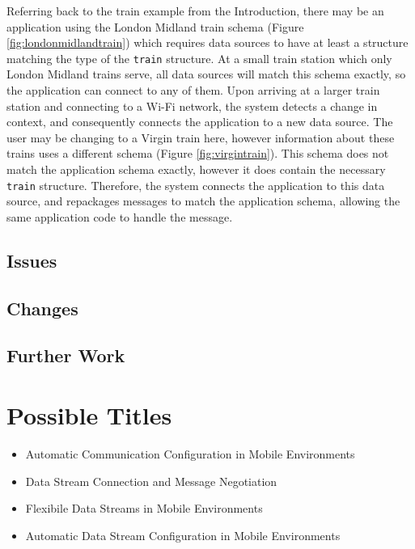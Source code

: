 \documentclass[12pt,twoside,notitlepage]{report}
\begin{document}
Referring back to the train example from the Introduction, there may be an application using the London Midland train schema (Figure \ref{fig:londonmidlandtrain}) which requires data sources to have at least a structure matching the type of the {\tt train} structure. 
At a small train station which only London Midland trains serve, all data sources will match this schema exactly, so the application can connect to any of them.
Upon arriving at a larger train station and connecting to a Wi-Fi network, the system detects a change in context, and consequently connects the application to a new data source. 
The user may be changing to a Virgin train here, however information about these trains uses a different schema (Figure \ref{fig:virgintrain}). 
This schema does not match the application schema exactly, however it does contain the necessary {\tt train} structure. 
Therefore, the system connects the application to this data source, and repackages messages to match the application schema, allowing the same application code to handle the message.

\section{Issues}

\section{Changes}

\section{Further Work}


\cleardoublepage


\nocite{*}

\cleardoublepage

\appendix

\chapter{Possible Titles}

\begin{itemize}
\item Automatic Communication Configuration in Mobile Environments
\item Data Stream Connection and Message Negotiation
\item Flexibile Data Streams in Mobile Environments
\item Automatic Data Stream Configuration in Mobile Environments
\end{itemize}
\end{document}
